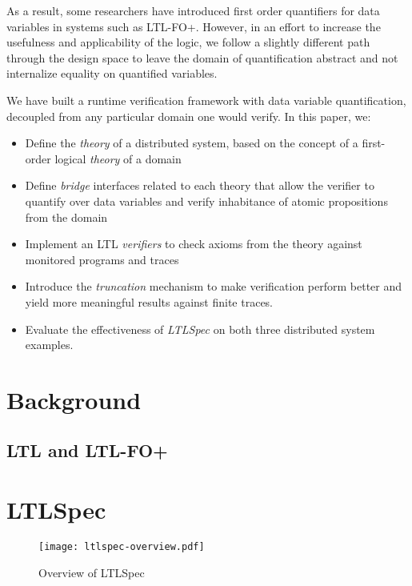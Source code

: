 \documentclass[format=acmsmall, nonacm=true, review=true]{acmart}
\newcommand{\ltlspec}{\textit{LTLSpec}\xspace}
\begin{document}
As a result, some researchers have introduced first order quantifiers for data variables \cite{khoury_automata-based_2021,margaria_execution_2016,halle_runtime_2012} in systems such as LTL-FO+.
However, in an effort to increase the usefulness and applicability of the logic, we follow a slightly different path through the design space to leave the domain of quantification abstract and not internalize equality on quantified variables.

We have built a runtime verification framework with data variable quantification, decoupled from any particular domain one would verify.
In this paper, we:
\begin{itemize}
  \item Define the \textit{theory} of a distributed system, based on the concept of a first-order logical \textit{theory} of a domain
  \item Define \textit{bridge} interfaces related to each theory that allow the verifier to quantify over data variables and verify inhabitance of atomic propositions from the domain
  \item Implement an LTL \textit{verifiers} to check axioms from the theory against monitored programs and traces
  \item Introduce the \textit{truncation} mechanism to make verification perform better and yield more meaningful results against finite traces.
  \item Evaluate the effectiveness of \ltlspec on both three distributed system examples.
\end{itemize}

\section{Background}

\subsection{LTL and LTL-FO+}

\section{LTLSpec}

\begin{figure}[h]
  \texttt{[image: ltlspec-overview.pdf]}
  \centering
  \caption{Overview of LTLSpec}
  \label{fig:overview}
\end{figure}
\end{document}
